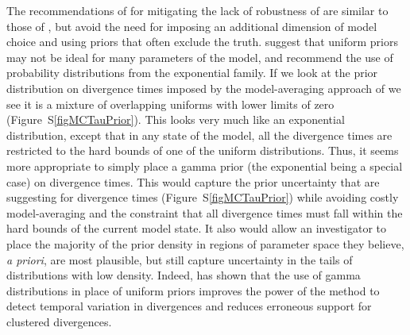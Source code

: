 The recommendations of \citet{Oaks2012} for mitigating the lack of robustness
of \msb are similar to those of \citet{Hickerson2013}, but avoid the need for
imposing an additional dimension of model choice and using priors that often
exclude the truth.
\citet{Oaks2012} suggest that uniform priors may not be ideal for many
parameters of the \msb model, and recommend the use of probability
distributions from the exponential family.
If we look at the prior distribution on divergence times imposed by
the model-averaging approach of \citet{Hickerson2013} we see it is a mixture of
overlapping uniforms with lower limits of zero (Figure~S\ref{figMCTauPrior}).
This looks very much like an exponential distribution, except that in any state
of the model, all the divergence times are restricted to the hard
bounds of one of the uniform distributions.
Thus, it seems more appropriate to simply place a gamma prior (the exponential
being a special case) on divergence times.
This would capture the prior uncertainty that \citet{Hickerson2013} are
suggesting for divergence times (Figure~S\ref{figMCTauPrior}) while avoiding
costly model-averaging and the constraint that all divergence times must fall
within the hard bounds of the current model state.
It also would allow an investigator to place the majority of the prior density
in regions of parameter space they believe, \emph{a priori}, are most
plausible, but still capture uncertainty in the tails of distributions with low
density.
Indeed, \citet{Oaks2014dpp} has shown that the use of gamma distributions in
place of uniform priors improves the power of the method to detect temporal
variation in divergences and reduces erroneous support for clustered
divergences.



